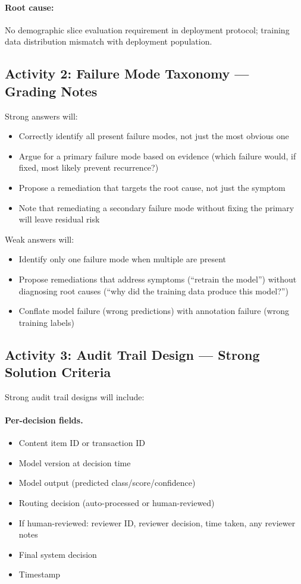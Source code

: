 \paragraph{Root cause:} No demographic slice evaluation requirement in deployment protocol; training data distribution mismatch with deployment population.

\subsection{Activity 2: Failure Mode Taxonomy --- Grading Notes}

Strong answers will:
\begin{itemize}
    \item Correctly identify all present failure modes, not just the most obvious one
    \item Argue for a primary failure mode based on evidence (which failure would, if fixed, most likely prevent recurrence?)
    \item Propose a remediation that targets the root cause, not just the symptom
    \item Note that remediating a secondary failure mode without fixing the primary will leave residual risk
\end{itemize}

Weak answers will:
\begin{itemize}
    \item Identify only one failure mode when multiple are present
    \item Propose remediations that address symptoms (``retrain the model'') without diagnosing root causes (``why did the training data produce this model?'')
    \item Conflate model failure (wrong predictions) with annotation failure (wrong training labels)
\end{itemize}

\subsection{Activity 3: Audit Trail Design --- Strong Solution Criteria}

Strong audit trail designs will include:

\paragraph{Per-decision fields.}
\begin{itemize}
    \item Content item ID or transaction ID
    \item Model version at decision time
    \item Model output (predicted class/score/confidence)
    \item Routing decision (auto-processed or human-reviewed)
    \item If human-reviewed: reviewer ID, reviewer decision, time taken, any reviewer notes
    \item Final system decision
    \item Timestamp
\end{itemize}

